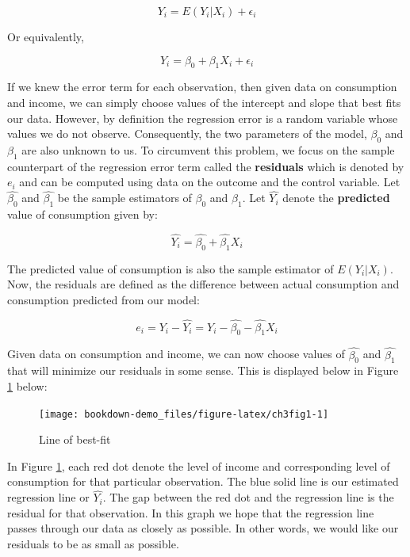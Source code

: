 \documentclass[
]{book}
\theoremstyle{definition}
\theoremstyle{definition}
\theoremstyle{definition}
\theoremstyle{definition}
\theoremstyle{remark}
\begin{document}
\[Y_i=E(Y_i|X_i)+\epsilon_i \]

Or equivalently,

\[Y_i=\beta_0 + \beta_1 X_i + \epsilon_i\]

If we knew the error term for each observation, then given data on consumption and income, we can simply choose values of the intercept and slope that best fits our data. However, by definition the regression error is a random variable whose values we do not observe. Consequently, the two parameters of the model, \(\beta_0\) and \(\beta_1\) are also unknown to us. To circumvent this problem, we focus on the sample counterpart of the regression error term called the \textbf{residuals} which is denoted by \(e_i\) and can be computed using data on the outcome and the control variable. Let \(\hat{\beta_0}\) and \(\hat{\beta_1}\) be the sample estimators of \(\beta_0\) and \(\beta_1\). Let \(\hat{Y_i}\) denote the \textbf{predicted} value of consumption given by:

\[\hat{Y_i}=\hat{\beta_0} + \hat{\beta_1} X_i \]

The predicted value of consumption is also the sample estimator of \(E(Y_i|X_i)\). Now, the residuals are defined as the difference between actual consumption and consumption predicted from our model:

\[e_i=Y_i -\hat{Y_i}= Y_i- \hat{\beta_0} - \hat{\beta_1} X_i\]

Given data on consumption and income, we can now choose values of \(\hat{\beta_0}\) and \(\hat{\beta_1}\) that will minimize our residuals in some sense. This is displayed below in Figure \ref{fig:ch3fig1} below:

\begin{figure}

{\centering \texttt{[image: bookdown-demo\_files/figure-latex/ch3fig1-1]} 

}

\caption{Line of best-fit}\label{fig:ch3fig1}
\end{figure}

In Figure \ref{fig:ch3fig1}, each red dot denote the level of income and corresponding level of consumption for that particular observation. The blue solid line is our estimated regression line or \(\hat{Y_i}\). The gap between the red dot and the regression line is the residual for that observation. In this graph we hope that the regression line passes through our data as closely as possible. In other words, we would like our residuals to be as small as possible.
\end{document}
